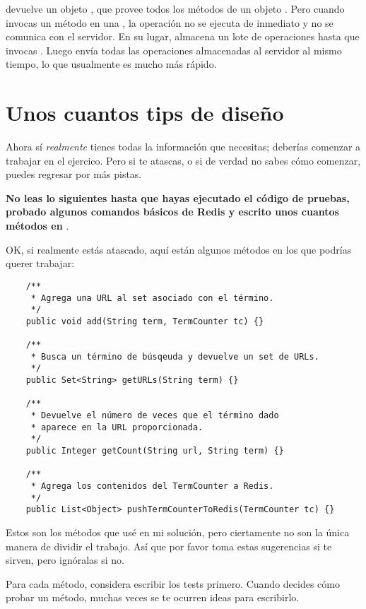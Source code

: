 \documentclass[12pt]{book}
\theoremstyle{exercise}
\begin{document}
 devuelve un objeto , que provee
todos los métodos de un objeto . Pero cuando invocas un
método en una , la operación no se ejecuta de inmediato
y no se comunica con el servidor. En su lugar, almacena un lote de operaciones
hasta que invocas . Luego envía todas las operaciones almacenadas
al servidor al mismo tiempo, lo que usualmente es mucho más rápido.




\section{Unos cuantos tips de diseño}
\label{a-few-design-hints}

Ahora sí \emph{realmente} tienes todas la información que necesitas; deberías
comenzar a trabajar en el ejercico. Pero si te atascas, o si de verdad no sabes
cómo comenzar, puedes regresar por más pistas.

\textbf{No leas lo siguientes hasta que hayas ejecutado el código de pruebas, 
probado algunos comandos básicos de Redis y escrito unos cuantos métodos en
}.

OK, si realmente estás atascado, aquí están algunos métodos en los que podrías
querer trabajar:

\begin{verbatim}
    /**
     * Agrega una URL al set asociado con el término.
     */
    public void add(String term, TermCounter tc) {}

    /**
     * Busca un término de búsqeuda y devuelve un set de URLs.
     */
    public Set<String> getURLs(String term) {}

    /**
     * Devuelve el número de veces que el término dado
     * aparece en la URL proporcionada.
     */
    public Integer getCount(String url, String term) {}

    /**
     * Agrega los contenidos del TermCounter a Redis.
     */
    public List<Object> pushTermCounterToRedis(TermCounter tc) {}
\end{verbatim}

Estos son los métodos que usé en mi solución, pero ciertamente no
son la única manera de dividir el trabajo. Así que por favor toma
estas sugerencias si te sirven, pero ignóralas si no.

Para cada método, considera escribir los tests primero. Cuando decides
cómo probar un método, muchas veces se te ocurren ideas para escribirlo.
\end{document}
